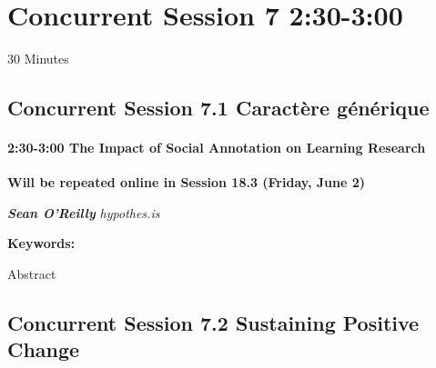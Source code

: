 \documentclass[
]{book}
\begin{document}
\hypertarget{concurrent-session-7-230-300}{%
\section*{Concurrent Session 7 \textbar{} 2:30-3:00}\label{concurrent-session-7-230-300}}

30 Minutes

\hypertarget{concurrent-session-7.1-wildcard}{%
\subsection*{Concurrent Session 7.1 \textbar{} Caractère générique}\label{concurrent-session-7.1-wildcard}}

\begin{vendor}
\hypertarget{the-impact-of-social-annotation-on-learning-research}{%
\paragraph*{\texorpdfstring{2:30-3:00 \textbar{} \textbf{The Impact of
Social Annotation on Learning} \textbar{}
Research}{2:30-3:00 \textbar{} The Impact of Social Annotation on Learning \textbar{} Research}}\label{the-impact-of-social-annotation-on-learning-research}}

\textbf{Will be repeated online in Session 18.3 (Friday, June 2)}

\textbf{\emph{Sean O'Reilly}} \textbar{} \emph{hypothes.is}

\textbf{Keywords:}

Abstract
\end{vendor}

\hypertarget{concurrent-session-7.2-sustaining-positive-change}{%
\subsection*{Concurrent Session 7.2 \textbar{} Sustaining Positive Change}\label{concurrent-session-7.2-sustaining-positive-change}}
\end{document}
